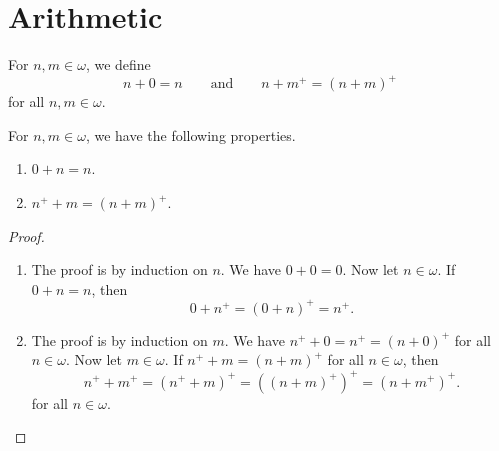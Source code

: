\section{Arithmetic}
\begin{definition}
  For $n, m \in \omega$, we define
  \begin{equation*}
    n + 0 = n
    \qquad \text{and} \qquad
    n + m^+ = (n + m)^+
  \end{equation*}
  for all $n, m \in \omega$.
\end{definition}

\begin{lemma}
  For $n, m \in \omega$, we have the following properties.
  \begin{enumerate}
    \item $0 + n = n$.
    \item $n^+ + m = (n + m)^+$.
  \end{enumerate}
\end{lemma}
\begin{proof}
  \leavevmode
  \begin{enumerate}
    \item The proof is by induction on $n$.
    We have $0 + 0 = 0$.
    Now let $n \in \omega$.
    If $0 + n = n$, then
    \begin{equation*}
      0 + n^+ = (0 + n)^+ = n^+.
    \end{equation*}
    \item The proof is by induction on $m$.
    We have $n^+ + 0 = n^+ = (n + 0)^+$ for all $n \in \omega$.
    Now let $m \in \omega$.
    If $n^+ + m = (n + m)^+$ for all $n \in \omega$, then
    \begin{equation*}
      n^+ + m^+ = (n^+ + m)^+ = ((n + m)^+)^+ = (n + m^+)^+.
    \end{equation*}
    for all $n \in \omega$.
    \qedhere
  \end{enumerate}
\end{proof}

